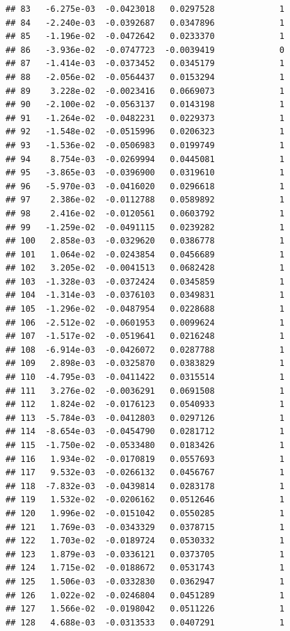 \documentclass[12pt]{article}\usepackage[]{graphicx}\usepackage[]{xcolor}
\makeatletter
\newenvironment{kframe}{%
 \def\at@end@of@kframe{}%
 \ifinner\ifhmode%
  \def\at@end@of@kframe{\end{minipage}}%
  \begin{minipage}{\columnwidth}%
 \fi\fi%
 \def\FrameCommand##1{\hskip\@totalleftmargin \hskip-\fboxsep
 \colorbox{shadecolor}{##1}\hskip-\fboxsep
     \hskip-\linewidth \hskip-\@totalleftmargin \hskip\columnwidth}%
 \MakeFramed {\advance\hsize-\width
   \@totalleftmargin\z@ \linewidth\hsize
   \@setminipage}}%
 {\par\unskip\endMakeFramed%
 \at@end@of@kframe}
\newenvironment{knitrout}{}{} %
\makeatother
\begin{document}
\begin{knitrout}
\begin{kframe}
\begin{verbatim}
## 83   -6.275e-03  -0.0423018   0.0297528             1
## 84   -2.240e-03  -0.0392687   0.0347896             1
## 85   -1.196e-02  -0.0472642   0.0233370             1
## 86   -3.936e-02  -0.0747723  -0.0039419             0
## 87   -1.414e-03  -0.0373452   0.0345179             1
## 88   -2.056e-02  -0.0564437   0.0153294             1
## 89    3.228e-02  -0.0023416   0.0669073             1
## 90   -2.100e-02  -0.0563137   0.0143198             1
## 91   -1.264e-02  -0.0482231   0.0229373             1
## 92   -1.548e-02  -0.0515996   0.0206323             1
## 93   -1.536e-02  -0.0506983   0.0199749             1
## 94    8.754e-03  -0.0269994   0.0445081             1
## 95   -3.865e-03  -0.0396900   0.0319610             1
## 96   -5.970e-03  -0.0416020   0.0296618             1
## 97    2.386e-02  -0.0112788   0.0589892             1
## 98    2.416e-02  -0.0120561   0.0603792             1
## 99   -1.259e-02  -0.0491115   0.0239282             1
## 100   2.858e-03  -0.0329620   0.0386778             1
## 101   1.064e-02  -0.0243854   0.0456689             1
## 102   3.205e-02  -0.0041513   0.0682428             1
## 103  -1.328e-03  -0.0372424   0.0345859             1
## 104  -1.314e-03  -0.0376103   0.0349831             1
## 105  -1.296e-02  -0.0487954   0.0228688             1
## 106  -2.512e-02  -0.0601953   0.0099624             1
## 107  -1.517e-02  -0.0519641   0.0216248             1
## 108  -6.914e-03  -0.0426072   0.0287788             1
## 109   2.898e-03  -0.0325870   0.0383829             1
## 110  -4.795e-03  -0.0411422   0.0315514             1
## 111   3.276e-02  -0.0036291   0.0691508             1
## 112   1.824e-02  -0.0176123   0.0540933             1
## 113  -5.784e-03  -0.0412803   0.0297126             1
## 114  -8.654e-03  -0.0454790   0.0281712             1
## 115  -1.750e-02  -0.0533480   0.0183426             1
## 116   1.934e-02  -0.0170819   0.0557693             1
## 117   9.532e-03  -0.0266132   0.0456767             1
## 118  -7.832e-03  -0.0439814   0.0283178             1
## 119   1.532e-02  -0.0206162   0.0512646             1
## 120   1.996e-02  -0.0151042   0.0550285             1
## 121   1.769e-03  -0.0343329   0.0378715             1
## 122   1.703e-02  -0.0189724   0.0530332             1
## 123   1.879e-03  -0.0336121   0.0373705             1
## 124   1.715e-02  -0.0188672   0.0531743             1
## 125   1.506e-03  -0.0332830   0.0362947             1
## 126   1.022e-02  -0.0246804   0.0451289             1
## 127   1.566e-02  -0.0198042   0.0511226             1
## 128   4.688e-03  -0.0313533   0.0407291             1

\end{verbatim}
\end{kframe}
\end{knitrout}
\end{document}
